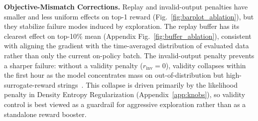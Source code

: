 \documentclass{article}
\begin{document}
\textbf{Objective-Mismatch Corrections.} 
Replay and invalid-output penalties have smaller and less uniform effects on top-1 reward (Fig.~\ref{fig:barplot_ablation}), but they stabilize failure modes induced by exploration. The replay buffer has its clearest effect on top-10\% mean (Appendix Fig.~\ref{fig:buffer_ablation}), consistent with aligning the gradient with the time-averaged distribution of evaluated data rather than only the current on-policy batch. The invalid-output penalty prevents a sharper failure: without a validity penalty ($r_{\text{inv}}{=}0$), validity collapses within the first hour as the model concentrates mass on out-of-distribution but high-surrogate-reward strings~\citep{wangFineTuningDiscreteDiffusion2024, ueharaELEGANT2024}. This collapse is driven primarily by the likelihood penalty in Density Entropy Regularization (Appendix~\ref{app:knobs}), so validity control is best viewed as a guardrail for aggressive exploration rather than as a standalone reward booster.
\end{document}
